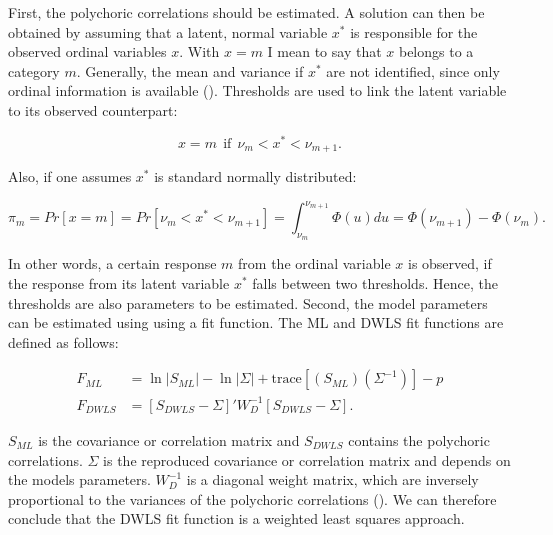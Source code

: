\documentclass[11pt]{article}
\begin{document}
First, the polychoric correlations should be estimated. A solution can then be
obtained by assuming that a latent, normal variable $x^*$ is responsible for the
observed ordinal variables $x$. With $x=m$ I mean to say that $x$ belongs to a
category $m$. Generally, the mean and variance if $x^*$ are not identified, since
only ordinal information is available (\cite{simsek2012}). Thresholds are used
to link the latent variable to its observed counterpart:

\begin{equation}
  x = m \:\: \text{if} \:\: \nu_m < x^* < \nu_{m+1} .
\end{equation}

Also, if one assumes $x^*$ is standard normally distributed:

\begin{equation}
  \pi_m = Pr[x=m] = Pr[\nu_m < x^* < \nu_{m+1}] = \int^{\nu_{m+1}}_{\nu_m} \Phi(u)du = \Phi(\nu_{m+1}) - \Phi(\nu_m) .
\end{equation}

In other words, a certain response $m$ from the ordinal variable $x$ is observed,
if the response from its latent variable $x^*$ falls between two thresholds.
Hence, the thresholds are also parameters to be estimated. Second, the model
parameters can be estimated using using a fit function. The ML and DWLS fit
functions are defined as follows:

\begin{align}
  F_{ML} &= \ln |S_{ML}| - \ln |\Sigma| + \text{trace}[(S_{ML})(\Sigma^{-1})] - p \tag{ML fit function} \\
  F_{DWLS} &= [S_{DWLS}-\Sigma]' W^{-1}_D [S_{DWLS}-\Sigma].          \tag{DWLS fit function}
\end{align}

$S_{ML}$ is the covariance or correlation matrix and $S_{DWLS}$ contains the
polychoric correlations. $\Sigma$ is the reproduced covariance or correlation
matrix and depends on the models parameters. $W_D^{-1}$ is a diagonal weight
matrix, which are inversely proportional to the variances of the polychoric
correlations (\cite{yangwallentin2010}). We can therefore conclude that the
DWLS fit function is a weighted least squares approach.
\end{document}
